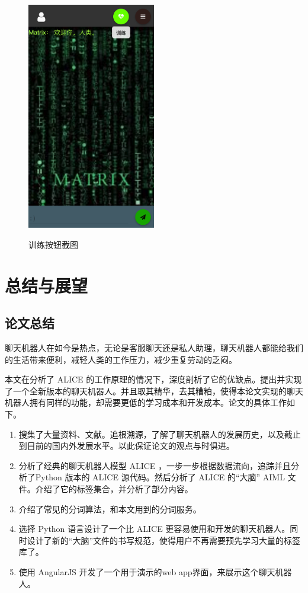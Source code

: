 \documentclass[bachelor,winfonts]{jnuthesis}
\begin{document}
\begin{figure}[H]
  \centering
  \includegraphics[width= 0.5\textwidth]{chat3.png}\\
  \caption{训练按钮截图}\label{fig:pic9}
\end{figure}




\chapter{总结与展望}
\section{论文总结}

聊天机器人在如今是热点，无论是客服聊天还是私人助理，聊天机器人都能给我们的生活带来便利，减轻人类的工作压力，减少重复劳动的乏闷。

本文在分析了 ALICE 的工作原理的情况下，深度剖析了它的优缺点。提出并实现了一个全新版本的聊天机器人。并且取其精华，去其糟粕，使得本论文实现的聊天机器人拥有同样的功能，却需要更低的学习成本和开发成本。论文的具体工作如下。

\begin{enumerate}
\item 搜集了大量资料、文献。追根溯源，了解了聊天机器人的发展历史，以及截止到目前的国内外发展水平。以此保证论文的观点与时俱进。
\item 分析了经典的聊天机器人模型 ALICE ，一步一步根据数据流向，追踪并且分析了Python 版本的 ALICE 源代码。然后分析了 ALICE 的“大脑” AIML 文件。介绍了它的标签集合，并分析了部分内容。
\item 介绍了常见的分词算法，和本文用到的分词服务。
\item 选择 Python 语言设计了一个比 ALICE 更容易使用和开发的聊天机器人。同时设计了新的“大脑”文件的书写规范，使得用户不再需要预先学习大量的标签库了。
\item 使用 AngularJS 开发了一个用于演示的web app界面，来展示这个聊天机器人。
\end{enumerate}
\end{document}
